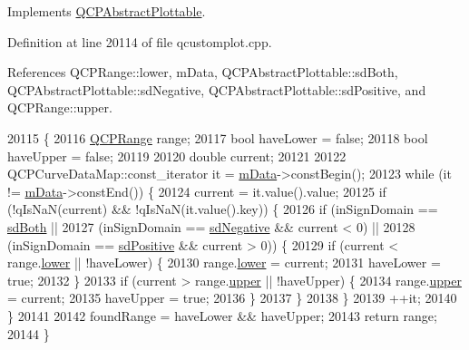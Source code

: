 Implements \hyperlink{class_q_c_p_abstract_plottable_aa3331b415b5939fe4df60b78831b2799}{Q\+C\+P\+Abstract\+Plottable}.



Definition at line 20114 of file qcustomplot.\+cpp.



References Q\+C\+P\+Range\+::lower, m\+Data, Q\+C\+P\+Abstract\+Plottable\+::sd\+Both, Q\+C\+P\+Abstract\+Plottable\+::sd\+Negative, Q\+C\+P\+Abstract\+Plottable\+::sd\+Positive, and Q\+C\+P\+Range\+::upper.


\begin{DoxyCode}
20115                                                                 \{
20116   \hyperlink{class_q_c_p_range}{QCPRange} range;
20117   \textcolor{keywordtype}{bool} haveLower = \textcolor{keyword}{false};
20118   \textcolor{keywordtype}{bool} haveUpper = \textcolor{keyword}{false};
20119 
20120   \textcolor{keywordtype}{double} current;
20121 
20122   QCPCurveDataMap::const\_iterator it = \hyperlink{class_q_c_p_curve_a88d533e455bca96004b049e99168731b}{mData}->constBegin();
20123   \textcolor{keywordflow}{while} (it != \hyperlink{class_q_c_p_curve_a88d533e455bca96004b049e99168731b}{mData}->constEnd()) \{
20124     current = it.value().value;
20125     \textcolor{keywordflow}{if} (!qIsNaN(current) && !qIsNaN(it.value().key)) \{
20126       \textcolor{keywordflow}{if} (inSignDomain == \hyperlink{class_q_c_p_abstract_plottable_a661743478a1d3c09d28ec2711d7653d8a082b98cfb91a7363a3b5cd17b0c1cd60}{sdBoth} ||
20127           (inSignDomain == \hyperlink{class_q_c_p_abstract_plottable_a661743478a1d3c09d28ec2711d7653d8a0fc9a70796ef60ad18ddd18056e6dc63}{sdNegative} && current < 0) ||
20128           (inSignDomain == \hyperlink{class_q_c_p_abstract_plottable_a661743478a1d3c09d28ec2711d7653d8a02951859f243a4d24e779cfbb5471030}{sdPositive} && current > 0)) \{
20129         \textcolor{keywordflow}{if} (current < range.\hyperlink{class_q_c_p_range_aa3aca3edb14f7ca0c85d912647b91745}{lower} || !haveLower) \{
20130           range.\hyperlink{class_q_c_p_range_aa3aca3edb14f7ca0c85d912647b91745}{lower} = current;
20131           haveLower = \textcolor{keyword}{true};
20132         \}
20133         \textcolor{keywordflow}{if} (current > range.\hyperlink{class_q_c_p_range_ae44eb3aafe1d0e2ed34b499b6d2e074f}{upper} || !haveUpper) \{
20134           range.\hyperlink{class_q_c_p_range_ae44eb3aafe1d0e2ed34b499b6d2e074f}{upper} = current;
20135           haveUpper = \textcolor{keyword}{true};
20136         \}
20137       \}
20138     \}
20139     ++it;
20140   \}
20141 
20142   foundRange = haveLower && haveUpper;
20143   \textcolor{keywordflow}{return} range;
20144 \}
\end{DoxyCode}
\hypertarget{class_q_c_p_curve_a0314dd644258949aeb4a95cebde5abaf}{}
